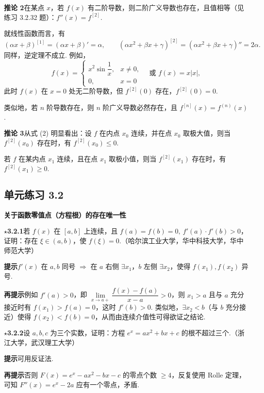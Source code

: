 \documentclass[UTF8, 12pt, fontset=fandol, oneside]{ctexart}
\begin{document}
\noindent\textbf{推论 2}\quad 在某点 $x$，若 $f(x)$ 有二阶导数，则二阶广义导数也存在，且值相等（见练习 3.2.32 题）：$f''(x)=f^{[2]}$.

就线性函数而言，有
\[
  (\alpha x+\beta)^{[1]}=(\alpha x+\beta)'=\alpha,
  \qquad
  (\alpha x^2+\beta x+\gamma)^{[2]}=(\alpha x^2+\beta x+\gamma)''=2\alpha.
\]
同样，逆定理不成立. 例如，
\[
  f(x)=
  \begin{cases}
    x^2\sin\dfrac1x,& x\ne0,\\
    0,& x=0
  \end{cases}
  \quad\text{或 }f(x)=x|x|,
\]
此时 $f(x)$ 在 $x=0$ 处无二阶导数，但 $f^{[2]}(0)$ 存在，$f^{[2]}(0)=0$.

类似地，若 $n$ 阶导数存在，则 $n$ 阶广义导数必然存在，且 $f^{[n]}(x)=f^{(n)}(x)$.

\noindent\textbf{推论 3}\quad 从式 (2) 明显看出：设 $f$ 在内点 $x_0$ 连续，并在点 $x_0$ 取极大值，则当 $f^{[2]}(x_0)$ 存在时，有 $f^{[2]}(x_0)\le0$.

若 $f$ 在某内点 $x_1$ 连续，且在点 $x_1$ 取极小值，则当 $f^{[2]}(x_1)$ 存在时，有 $f^{[2]}(x_1)\ge0$.

\subsection*{单元练习 3.2}

\noindent\textbf{关于函数零值点（方程根）的存在唯一性}

\noindent\textbf{$\star$3.2.1}\quad 若 $f(x)$ 在 $[a,b]$ 上连续，且 $f(a)=f(b)=0,\ f'(a)\cdot f'(b)>0$，证明：存在 $\xi\in(a,b)$，使 $f(\xi)=0$.（哈尔滨工业大学，华中科技大学，华中师范大学）

\noindent\textbf{提示}\quad $f'(x)$ 在 $a,b$ 同号 $\Rightarrow$ 在 $a$ 右侧 $\exists x_1$，$b$ 左侧 $\exists x_2$，使得 $f(x_1),f(x_2)$ 异号.

\noindent\textbf{再提示}\quad 例如 $f'(a)>0$，即 $\lim\limits_{x\to a+}\dfrac{f(x)-f(a)}{x-a}>0$，则 $x_1>a$ 且与 $a$ 充分接近时有 $f(x_1)>f(a)=0$，这时 $f'(b)>0$. 类似地，$\exists x_2<b$（与 $b$ 充分接近）使得 $f(x_2)<f(b)=0$，从而由连续介值性可得欲证之结论.

\noindent\textbf{$\star$3.2.2}\quad 设 $a,b,c$ 为三个实数，证明：方程 $e^x=ax^2+bx+c$ 的根不超过三个.（浙江大学，武汉理工大学）

\noindent\textbf{提示}\quad 可用反证法.

\noindent\textbf{再提示}\quad 否则 $F(x)=e^x-ax^2-bx-c$ 的零点个数 $\ge4$，反复使用 Rolle 定理，可知 $F''(x)=e^x-2a$ 应有一个零点，矛盾.
\end{document}
